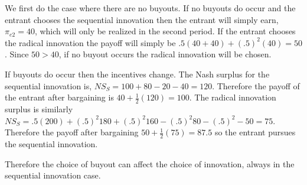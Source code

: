 \documentclass[11pt]{article}
\newtheorem{proposition}{Proposition}
\begin{document}
We first do the case where there are no buyouts. If no buyouts do occur and the entrant chooses the sequential innovation then the entrant will simply earn, $\pi_{e2}=40$, which will only be realized in the second period. If the entrant chooses the radical innovation the payoff will simply be $.5(40+40)+(.5)^2(40)=50$. Since $50>40$, if no buyout occurs the radical innovation will be chosen. 

If buyouts do occur then the incentives change. The Nash surplus for the sequential innovation is, $NS_S = 100+80-20-40=120$. Therefore the payoff of the entrant after bargaining is $40+\frac{1}{2}(120)=100$. The radical innovation surplus is similarly $NS_S = .5(200)+(.5)^2 180+(.5)^2 160-(.5)^2 80-(.5)^2-50=75$. Therefore the payoff after bargaining $50+\frac{1}{2}(75)=87.5$ so the entrant pursues the sequential innovation. 

Therefore the choice of buyout can affect the choice of innovation, always in the sequential innovation case. 








\end{document}
